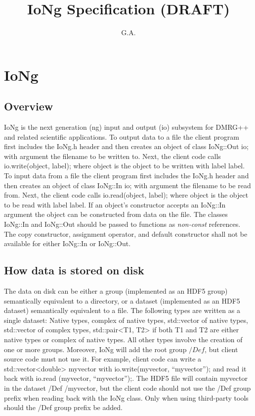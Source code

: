 \documentclass{article}
\newcommand{\code}[1]{{\ttfamily #1}}
\begin{document}
\title{IoNg Specification (DRAFT)}
\author{G.A.}
\maketitle
\thispagestyle{fancy}

\section{IoNg}
\subsection{Overview}
\code{IoNg} is the next generation (ng) input and output (io) subsystem for 
\textsc{DMRG++} and related 
scientific applications. To output data to a file the
client program first includes the \code{IoNg.h} header and then creates an object of class
\code{IoNg::Out io;} with argument the filename to be written to.
Next, the client code calls \code{io.write(object, label);} where
\code{object} is the object to be written with label \code{label}.
To input data from a file the client program first includes the 
\code{IoNg.h} header and then creates an object of class
\code{IoNg::In io;} with argument the filename to be read from.
Next, the client code calls \code{io.read(object, label);} where
\code{object} is the object to be read with label \code{label}.
If an object's constructor accepts an \code{IoNg::In} argument the object
can be constructed from data on the file.
The classes \code{IoNg::In} and \code{IoNg::Out} should be passed
to functions as \emph{non-const} references.
The copy constructor, assignment operator, and default constructor shall not
be available for either \code{IoNg::In} or \code{IoNg::Out}.

\subsection{How data is stored on disk}
The data on disk can be either a group (implemented as an HDF5 group) semantically
equivalent to a directory, or a dataset (implemented as an HDF5 dataset)
semantically equivalent to a file.
The following types are written as a single dataset:
Native types, complex of native types, std::vector of native types, 
std::vector of complex types, \code{std::pair<T1, T2>} if both \code{T1} and \code{T2} 
are either native types or complex of native types.
All other types involve the creation of one or more groups.
Moreover, \code{IoNg} will add the root group $/Def$, but client
source code must not use it. For example, client code
can write a \code{std::vector<double>} \code{myvector} with \code{io.write(myvector,} 
\code{``myvector'');}
and read it back with \code{io.read} \code{(myvector,} \code{``myvector'');}.
The HDF5 file will contain \code{myvector}  in the dataset \code{/Def} \code{/myvector,} but the client
code should not use the \code{/Def} group prefix when reading back with the \code{IoNg} class.
Only when using third-party tools should the \code{/Def} group prefix be added.
\end{document}
